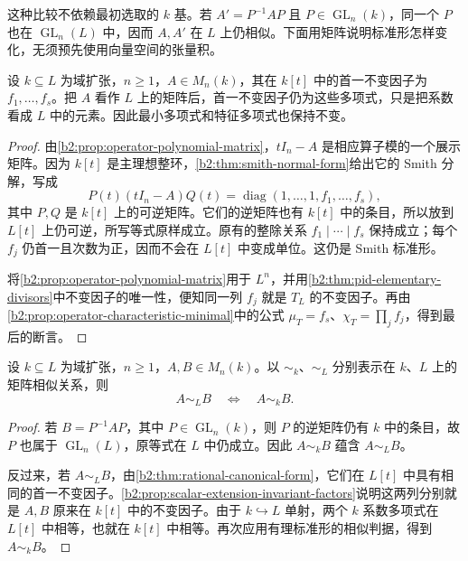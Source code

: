 \ProseParagraphBreak
这种比较不依赖最初选取的 \(k\) 基。若 \(A'=P^{-1}AP\) 且 \(P\in\operatorname{GL}_n(k)\)，同一个 \(P\) 也在 \(\operatorname{GL}_n(L)\) 中，因而 \(A,A'\) 在 \(L\) 上仍相似。下面用矩阵说明标准形怎样变化，无须预先使用向量空间的张量积。

\begin{proposition}\label{b2:prop:scalar-extension-invariant-factors}
	设 \(k\subseteq L\) 为域扩张，\(n\ge1\)，\(A\in M_n(k)\)，其在 \(k[t]\) 中的首一不变因子为 \(f_1,\ldots,f_s\)。把 \(A\) 看作 \(L\) 上的矩阵后，首一不变因子仍为这些多项式，只是把系数看成 \(L\) 中的元素。因此最小多项式和特征多项式也保持不变。
\end{proposition}
\begin{proof}
	由\cref{b2:prop:operator-polynomial-matrix}，\(tI_n-A\) 是相应算子模的一个展示矩阵。因为 \(k[t]\) 是主理想整环，\cref{b2:thm:smith-normal-form}给出它的 Smith 分解，写成
	\[
		P(t)(tI_n-A)Q(t) =\operatorname{diag}(1,\ldots,1,f_1,\ldots,f_s),
	\]
	其中 \(P,Q\) 是 \(k[t]\) 上的可逆矩阵。它们的逆矩阵也有 \(k[t]\) 中的条目，所以放到 \(L[t]\) 上仍可逆，所写等式原样成立。原有的整除关系 \(f_1\mid\cdots\mid f_s\) 保持成立；每个 \(f_j\) 仍首一且次数为正，因而不会在 \(L[t]\) 中变成单位。这仍是 Smith 标准形。

	将\cref{b2:prop:operator-polynomial-matrix}用于 \(L^n\)，并用\cref{b2:thm:pid-elementary-divisors}中不变因子的唯一性，便知同一列 \(f_j\) 就是 \(T_L\) 的不变因子。再由\cref{b2:prop:operator-characteristic-minimal}中的公式 \(\mu_T=f_s\)、\(\chi_T=\prod_j f_j\)，得到最后的断言。
\end{proof}

\begin{corollary}\label{b2:cor:similarity-descent}
	设 \(k\subseteq L\) 为域扩张，\(n\ge1\)，\(A,B\in M_n(k)\)。以 \(\sim_k\)、\(\sim_L\) 分别表示在 \(k\)、\(L\) 上的矩阵相似关系，则
	\[
		A\sim_LB\quad\Longleftrightarrow\quad A\sim_kB.
	\]
\end{corollary}
\begin{proof}
	若 \(B=P^{-1}AP\)，其中 \(P\in\operatorname{GL}_n(k)\)，则 \(P\) 的逆矩阵仍有 \(k\) 中的条目，故 \(P\) 也属于 \(\operatorname{GL}_n(L)\)，原等式在 \(L\) 中仍成立。因此 \(A\sim_kB\) 蕴含 \(A\sim_LB\)。

	反过来，若 \(A\sim_LB\)，由\cref{b2:thm:rational-canonical-form}，它们在 \(L[t]\) 中具有相同的首一不变因子。\cref{b2:prop:scalar-extension-invariant-factors}说明这两列分别就是 \(A,B\) 原来在 \(k[t]\) 中的不变因子。由于 \(k\hookrightarrow L\) 单射，两个 \(k\) 系数多项式在 \(L[t]\) 中相等，也就在 \(k[t]\) 中相等。再次应用有理标准形的相似判据，得到 \(A\sim_kB\)。
\end{proof}

